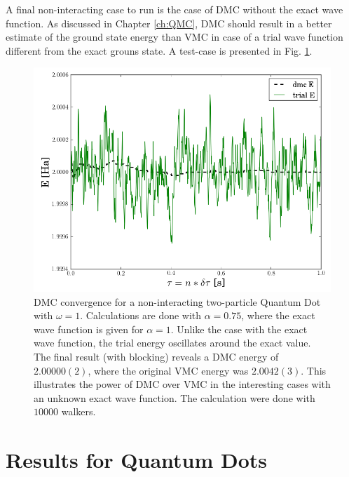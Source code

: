 A final non-interacting case to run is the case of DMC without the exact wave function. As discussed in Chapter \ref{ch:QMC}, DMC should result in a better estimate of the ground state energy than VMC in case of a trial wave function different from the exact grouns state. A test-case is presented in Fig. \ref{fig:DMC_nonExactWF}.

\begin{figure}
 \begin{center}
  \includegraphics[scale=0.5]{../Graphics/DMC_notExactWF.png}
  \caption{DMC convergence for a non-interacting two-particle Quantum Dot with $\omega=1$. Calculations are done with $\alpha=0.75$, where the exact wave function is given for $\alpha=1$. Unlike the case with the exact wave function, the trial energy oscillates around the exact value. The final result (with blocking) reveals a DMC energy of $2.00000(2)$, where the original VMC energy was $2.0042(3)$. This illustrates the power of DMC over VMC in the interesting cases with an unknown exact wave function. The calculation were done with $10000$ walkers.}
  \label{fig:DMC_nonExactWF}
 \end{center}
\end{figure}

\clearpage

\section{Results for Quantum Dots}

